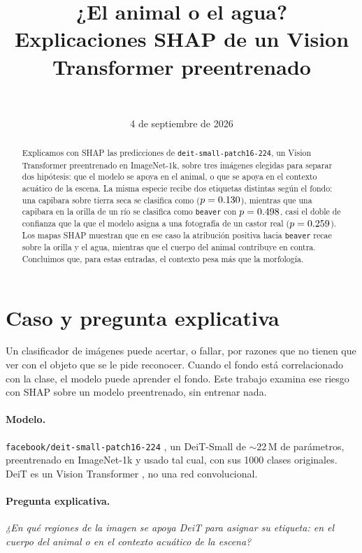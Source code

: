 \documentclass[11pt,a4paper]{article}
\title{\bfseries ¿El animal o el agua?\\[0.3em]
\large Explicaciones SHAP de un Vision Transformer preentrenado}
\author{\NombresUno \\[0.4em] \NombresDos}
\date{4 de septiembre de 2026}
\begin{document}
\maketitle

\begin{abstract}
\noindent
Explicamos con SHAP las predicciones de \texttt{deit-small-patch16-224}, un Vision
Transformer preentrenado en ImageNet-1k, sobre tres imágenes elegidas para separar dos
hipótesis: que el modelo se apoya en el animal, o que se apoya en el contexto acuático de la
escena. La misma especie recibe dos etiquetas distintas según el fondo: una capibara sobre
tierra seca se clasifica como \texttt{\imgOneTopUno} ($p=0.130$), mientras que una
capibara en la orilla de un río se clasifica como \texttt{beaver} con $p=0.498$,
casi el doble de confianza que la que el modelo asigna a una fotografía de un castor real
($p=0.259$). Los mapas SHAP muestran que en ese caso la atribución positiva hacia
\texttt{beaver} recae sobre la orilla y el agua, mientras que el cuerpo del animal contribuye
en contra. Concluimos que, para estas entradas, el contexto pesa más que la morfología.
\end{abstract}

\section{Caso y pregunta explicativa}

Un clasificador de imágenes puede acertar, o fallar, por razones que no tienen que ver con el
objeto que se le pide reconocer. Cuando el fondo está correlacionado con la clase, el modelo
puede aprender el fondo. Este trabajo examina ese riesgo con SHAP \cite{lundberg2017unified}
sobre un modelo preentrenado, sin entrenar nada.

\paragraph{Modelo.} \texttt{facebook/deit-small-patch16-224} \cite{hfdeit}, un DeiT-Small
\cite{touvron2021deit} de $\sim$22\,M de parámetros, preentrenado en ImageNet-1k
\cite{deng2009imagenet} y usado tal cual, con sus 1000 clases originales. DeiT es un Vision
Transformer \cite{dosovitskiy2021vit}, no una red convolucional.

\paragraph{Pregunta explicativa.} \emph{¿En qué regiones de la imagen se apoya DeiT para
asignar su etiqueta: en el cuerpo del animal o en el contexto acuático de la escena?}
\end{document}
